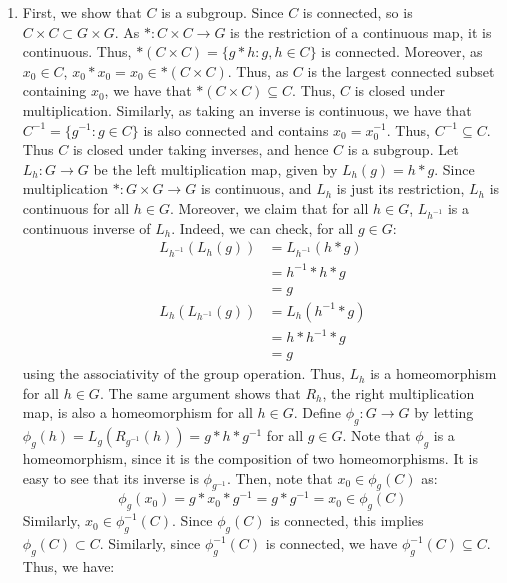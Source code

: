 \documentclass[12pt]{article}
\begin{document}
\begin{solution}
    \bbni
    \begin{enumerate}
        \item First, we show that $C$ is a subgroup. Since $C$ is connected, so is $C \times C \subset G \times G$. As $\ast: C \times C \to G$ is the restriction of a continuous map, it is continuous. Thus, $\ast(C \times C) = \{g\ast h : g, h \in C\}$ is connected. Moreover, as $x_0 \in C$, $x_0 \ast x_0 = x_0 \in \ast(C \times C)$. Thus, as $C$ is the largest connected subset containing $x_0$, we have that $\ast(C \times C) \subseteq C$. Thus, $C$ is closed under multiplication. Similarly, as taking an inverse is continuous, we have that $C^{-1} = \{g^{-1} : g \in C\}$ is also connected and contains $x_0 = x_0^{-1}$. Thus, $C^{-1} \subseteq C$. Thus $C$ is closed under taking inverses, and hence $C$ is a subgroup. \bbni
        Let $L_h: G \to G$ be the left multiplication map, given by $L_h(g) = h \ast g$. Since multiplication $*: G \times G \to G$ is continuous, and $L_h$ is just its restriction, $L_h$ is continuous for all $h \in G$. Moreover, we claim that for all $h \in G$, $L_{h^{-1}}$ is a continuous inverse of $L_h$. Indeed, we can check, for all $g \in G$:
        \begin{align*}
            L_{h^{-1}}(L_h(g)) &= L_{h^{-1}}(h \ast g) \\
            &= h^{-1} \ast h \ast g \\
            &= g \\
            L_{h}(L_{h^{-1}}(g)) &= L_{h}(h^{-1} \ast g) \\
            &= h \ast h^{-1} \ast g \\
            &= g
        \end{align*}
        using the associativity of the group operation. Thus, $L_h$ is a homeomorphism for all $h \in G$. The same argument shows that $R_h$, the right multiplication map, is also a homeomorphism for all $h \in G$. \bbni
        Define $\phi_g: G \to G$ by letting $\phi_g(h) = L_g(R_{g^{-1}}(h)) = g \ast h \ast g^{-1}$ for all $g \in G$. Note that $\phi_g$ is a homeomorphism, since it is the composition of two homeomorphisms. It is easy to see that its inverse is $\phi_{g^{-1}}$. Then, note that $x_0 \in \phi_g(C)$ as:
        \[ \phi_g(x_0) = g \ast x_0 \ast g^{-1} = g \ast g^{-1} = x_0 \in \phi_g(C)\]
        Similarly, $x_0 \in \phi_g^{-1}(C)$.         
        Since $\phi_g(C)$ is connected, this implies $\phi_g(C) \subset C$. Similarly, since $\phi_g^{-1}(C)$ is connected, we have $\phi_g^{-1}(C) \subseteq C$. Thus, we have:

\end{enumerate}
\end{solution}
\end{document}
